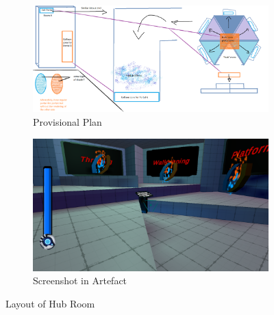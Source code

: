 \begin{figure}[H]
\centering
\begin{subfigure}{0.5\textwidth}
  \centering
  \includegraphics[width=1\linewidth]{Figures/hubplan.png}
  \caption{Provisional Plan}
\end{subfigure}%
\begin{subfigure}{0.5\textwidth}
  \centering
  \includegraphics[width=1\linewidth]{Figures/hub.png}
  \caption{Screenshot in Artefact}
\end{subfigure}
\caption{Layout of Hub Room}
\end{figure}


